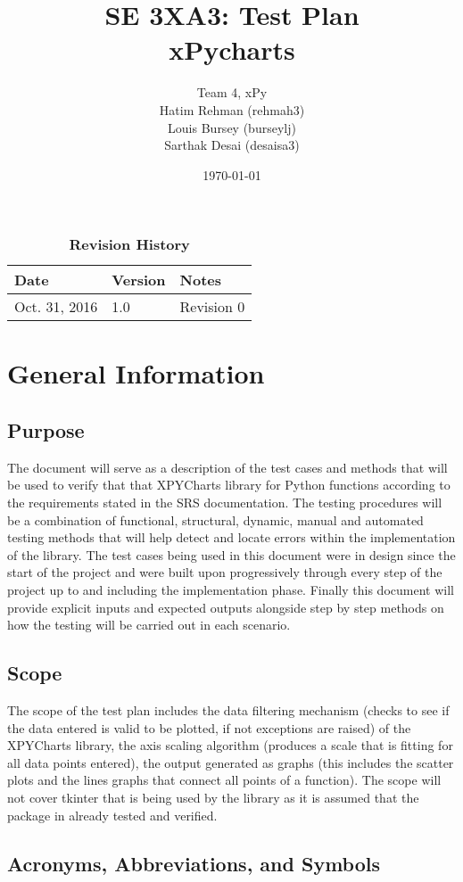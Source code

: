 \documentclass[12pt, titlepage]{article}
\title{SE 3XA3: Test Plan\\xPycharts}
\author{Team 4, xPy
		\\ Hatim Rehman (rehmah3)
		\\ Louis Bursey (burseylj)
		\\ Sarthak Desai (desaisa3)
}
\date{\today}
\begin{document}
\maketitle
{}
\tableofcontents
\listoftables
\listoffigures
\begin{table}[bp]
\caption{\bf Revision History}
\begin{tabularx}{\textwidth}{p{3cm}p{2cm}X}
\toprule {\bf Date} & {\bf Version} & {\bf Notes}\\
\midrule
Oct. 31, 2016 & 1.0 & Revision 0\\
\bottomrule
\end{tabularx}
\end{table}
\newpage
{}
\section{General Information}
\subsection{Purpose}
The document will serve as a description of the test cases and methods that will be used to verify that that XPYCharts library for Python functions according to the requirements stated in the SRS documentation. The testing procedures will be a combination of functional, structural, dynamic, manual and automated testing methods that will help detect and locate errors within the implementation of the library. The test cases being used in this document were in design since the start of the project and were built upon progressively through every step of the project up to and including the implementation phase. Finally this document will provide explicit inputs and expected outputs alongside step by step methods on how the testing will be carried out in each scenario. 
\subsection{Scope}
The scope of the test plan includes the data filtering mechanism (checks to see if the data entered is valid to be plotted, if not exceptions are raised) of the XPYCharts library, the axis scaling algorithm (produces a scale that is fitting for all data points entered), the output generated as graphs (this includes the scatter plots and the lines graphs that connect all points of a function). The scope will not cover tkinter that is being used by the library as it is assumed that the package in already tested and verified. 
\subsection{Acronyms, Abbreviations, and Symbols}
	
\end{document}
